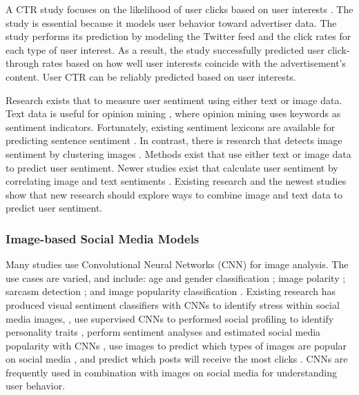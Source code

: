 \documentclass[mksc,blindrev]{informs3} %
\begin{document}
A CTR study focuses on the likelihood of user clicks based on user interests \cite{Li2015}. The study is essential because it models user behavior toward advertiser data. The study performs its prediction by modeling the Twitter feed and the click rates for each type of user interest. As a result, the study successfully predicted user click-through rates based on how well user interests coincide with the advertisement's content. User CTR can be reliably predicted based on user interests. 

Research exists that to measure user sentiment using either text or image data. Text data is useful for opinion mining \cite{Aggarwal2017AHA}, where opinion mining uses keywords as sentiment indicators. Fortunately, existing sentiment lexicons are available for predicting sentence sentiment \cite{Georgiou2015}. In contrast, there is research that detects image sentiment by clustering images \cite{Wang2015}. Methods exist that use either text or image data to predict user sentiment. Newer studies exist that calculate user sentiment by correlating image and text sentiments \cite{Zhao2019}. Existing research and the newest studies show that new research should explore ways to combine image and text data to predict user sentiment.

\subsubsection{Image-based Social Media Models}
Many studies use Convolutional Neural Networks (CNN) for image analysis. The use cases are varied, and include: age and gender classification \cite{Hassner2015}; image polarity \cite{Poria2016}; sarcasm detection \cite{Poria2016}; and image popularity classification \cite{Khosla2014}. Existing research has produced visual sentiment classifiers with CNNs \cite{Segalin2017,Xu2014} to identify stress within social media images, \cite{Lin2014}, use supervised CNNs to performed social profiling to identify personality traits \cite{Segalin2017}, perform sentiment analyses and estimated social media popularity with CNNs \cite{Gelli2015}, use images to predict which types of images are popular on social media \cite{Gelli2015}, and predict which posts will receive the most clicks \cite{Khosla2014}. CNNs are frequently used in combination with images on social media for understanding user behavior.
\end{document}
